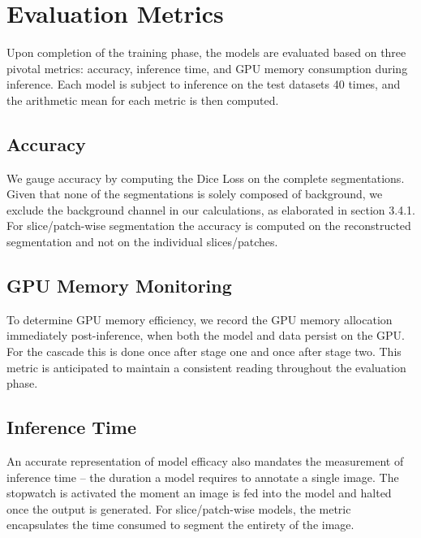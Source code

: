 \section{Evaluation Metrics}
Upon completion of the training phase, the models are evaluated based on three pivotal metrics: accuracy, inference time, and GPU memory consumption during inference.
Each model is subject to inference on the test datasets 40 times, and the arithmetic mean for each metric is then computed.

\subsection{Accuracy}
We gauge accuracy by computing the Dice Loss on the complete segmentations. Given that none of the segmentations is solely composed of background, we exclude the background channel in our calculations,
as elaborated in section 3.4.1. For slice/patch-wise segmentation the accuracy is computed on the reconstructed segmentation and not on the individual slices/patches.

\subsection{GPU Memory Monitoring}
To determine GPU memory efficiency, we record the GPU memory allocation immediately post-inference, when both the model and data persist on the GPU.
For the cascade this is done once after stage one and once after stage two. This metric is anticipated to maintain a consistent reading throughout the evaluation phase.

\subsection{Inference Time}
An accurate representation of model efficacy also mandates the measurement of inference time – the duration a model requires to annotate a single image.
The stopwatch is activated the moment an image is fed into the model and halted once the output is generated. For slice/patch-wise models,
the metric encapsulates the time consumed to segment the entirety of the image.

